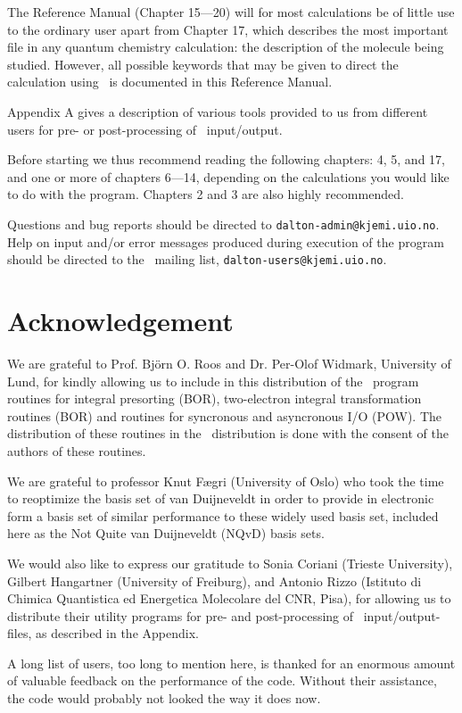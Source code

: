 \begin{description}
\item The Reference Manual (Chapter 15---20) will for most calculations be of
little use to the ordinary user apart from Chapter 17, which describes
the most important file in any quantum chemistry calculation: the
description of the molecule being studied. However, all possible
keywords that may be given to direct the calculation using \siraba\ is
documented in this Reference Manual.

\item Appendix A gives a description of various tools provided to us
from different users for pre- or post-processing of \siraba\
input/output.
\end{description}

Before starting we thus recommend reading
the following chapters: 4, 5, and 17, and one or more of chapters
6---14, depending on the
calculations you would like to do with the program. Chapters
2 and 3 are also highly recommended.

Questions and bug reports should be directed to
\verb|dalton-admin@kjemi.uio.no|. Help on input and/or error messages
produced during execution of the program should be directed to the
\siraba\ mailing list\index{mailing list}, \verb|dalton-users@kjemi.uio.no|.

\section{Acknowledgement}

We are grateful to Prof. Bj\"{o}rn O. Roos and Dr. Per-Olof
Widmark, University of Lund, for kindly allowing us to include in
this distribution of the \siraba\ program routines for integral
presorting (BOR), two-electron integral
transformation routines\index{integral transformation} (BOR) and
routines for syncronous and asyncronous I/O (POW). The
distribution of these routines in the \siraba\ distribution is
done with the consent of the authors of these routines.

We are grateful to professor Knut F\ae gri (University of Oslo) who
took the time to reoptimize the basis set of van Duijneveldt in order
to provide in electronic form a basis set of similar performance to
these widely used basis set, included here as the Not Quite van
Duijneveldt (NQvD) basis sets.

We would also like to express our gratitude to Sonia Coriani (Trieste
University), Gilbert Hangartner (University of Freiburg), and Antonio
Rizzo (Istituto di Chimica Quantistica ed Energetica Molecolare del
CNR, Pisa), for allowing us to distribute their utility programs for
pre- and post-processing of \siraba\ input/output-files, as described
in the Appendix.

A long list of users, too long to mention here, is thanked for an
enormous amount of valuable feedback on the performance of the
code. Without their assistance, the code would probably not looked the
way it does now.
